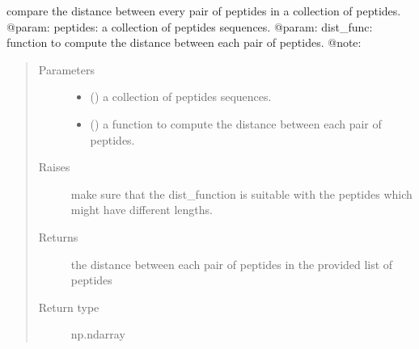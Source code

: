 \documentclass[letterpaper,10pt,english]{sphinxmanual}
\begin{document}
\begin{fulllineitems}
\label{\detokenize{IPTK.Analysis:IPTK.Analysis.AnalysisFunction.compute_binary_distance}}
compare the distance between every pair of peptides in a collection of peptides. 
@param: peptides: a collection of peptides sequences.
@param: dist\_func: function to compute the distance between each pair of peptides. 
@note:
\begin{quote}\begin{description}
\item[{Parameters}] \leavevmode\begin{itemize}
\item {} 
 (\sphinxstyleliteralemphasis{\sphinxupquote{{[}}}\sphinxstyleliteralemphasis{\sphinxupquote{{]}}}) \textendash{} a collection of peptides sequences.

\item {} 
 () \textendash{} a function to compute the distance between each pair of peptides.

\end{itemize}

\item[{Raises}] \leavevmode
{} \textendash{} make sure that the dist\_function is suitable with the peptides which might have different lengths.

\item[{Returns}] \leavevmode
the distance between each pair of peptides in the provided list of peptides

\item[{Return type}] \leavevmode
np.ndarray

\end{description}\end{quote}

\end{fulllineitems}

\end{document}
